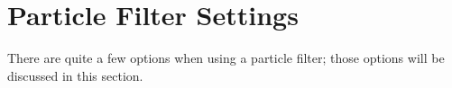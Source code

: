 %
%
%

\section{Particle Filter Settings}
There are quite a few options when using a particle filter; those
options will be discussed in this section.


